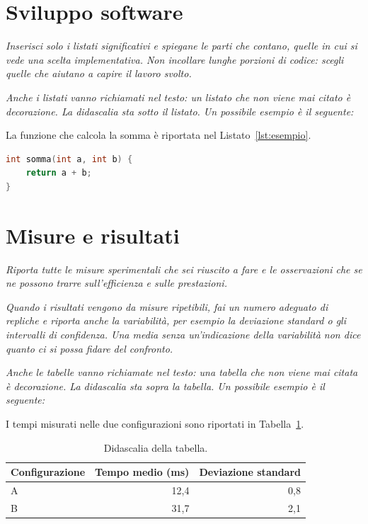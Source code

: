 \documentclass[12pt,a4paper,oneside]{report}
\newcommand{\guida}[1]{{\itshape\color{gray}#1\par}}
\newcommand{\esempio}[1]{#1\par}
\begin{document}
\section{Sviluppo software}
\guida{Inserisci solo i listati significativi e spiegane le parti che contano, quelle in cui si vede una scelta implementativa. Non incollare lunghe porzioni di codice: scegli quelle che aiutano a capire il lavoro svolto.}

\guida{Anche i listati vanno richiamati nel testo: un listato che non viene mai citato è decorazione. La didascalia sta sotto il listato. Un possibile esempio è il seguente:}
\esempio{La funzione che calcola la somma è riportata nel Listato~\ref{lst:esempio}.}

\begin{lstlisting}[language=C,caption={Didascalia del listato.},label=lst:esempio]
int somma(int a, int b) {
    return a + b;
}
\end{lstlisting}

\section{Misure e risultati}
\guida{Riporta tutte le misure sperimentali che sei riuscito a fare e le osservazioni che se ne possono trarre sull'efficienza e sulle prestazioni.}
\guida{Quando i risultati vengono da misure ripetibili, fai un numero adeguato di repliche e riporta anche la variabilità, per esempio la deviazione standard o gli intervalli di confidenza. Una media senza un'indicazione della variabilità non dice quanto ci si possa fidare del confronto.}

\guida{Anche le tabelle vanno richiamate nel testo: una tabella che non viene mai citata è decorazione. La didascalia sta sopra la tabella. Un possibile esempio è il seguente:}
\esempio{I tempi misurati nelle due configurazioni sono riportati in Tabella~\ref{tab:esempio}.}

\begin{table}[H]
  \centering
  \caption{Didascalia della tabella.}
  \label{tab:esempio}
  \begin{tabular}{lrr}
    \toprule
    Configurazione & Tempo medio (ms) & Deviazione standard \\
    \midrule
    A & 12,4 & 0,8 \\
    B & 31,7 & 2,1 \\
    \bottomrule
  \end{tabular}
\end{table}
\end{document}

